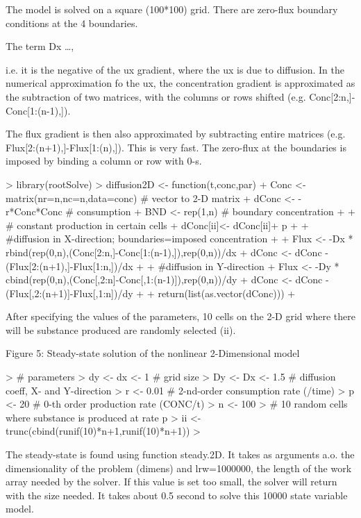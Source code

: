 \documentclass{tufte-handout}
\begin{document}
The model is solved on a square (100*100) grid. There are zero-flux boundary conditions at
the 4 boundaries.

The term Dx \ldots, 

i.e. it is the negative of the 
ux gradient, where the ux is due to diffusion. In the numerical approximation fo the 
ux, the concentration gradient is approximated as the subtraction of two matrices, with the columns or rows shifted (e.g. Conc[2:n,]-Conc[1:(n-1),]).

The flux gradient is then also approximated by subtracting entire matrices (e.g. Flux[2:(n+1),]-Flux[1:(n),]). This is very fast. The zero-flux at the boundaries is imposed by binding a column or row with 0-s.


\begin{Schunk}
\begin{Sinput}
> library(rootSolve)
> diffusion2D <- function(t,conc,par){
+ Conc <- matrix(nr=n,nc=n,data=conc) # vector to 2-D matrix
+ dConc <- -r*Conc*Conc # consumption
+ BND <- rep(1,n) # boundary concentration
+ 
+ # constant production in certain cells
+ dConc[ii]<- dConc[ii]+ p
+ 
+ #diffusion in X-direction; boundaries=imposed concentration
+ 
+ Flux <- -Dx * rbind(rep(0,n),(Conc[2:n,]-Conc[1:(n-1),]),rep(0,n))/dx
+ dConc <- dConc - (Flux[2:(n+1),]-Flux[1:n,])/dx
+ 
+ #diffusion in Y-direction
+ Flux <- -Dy * cbind(rep(0,n),(Conc[,2:n]-Conc[,1:(n-1)]),rep(0,n))/dy
+ dConc <- dConc - (Flux[,2:(n+1)]-Flux[,1:n])/dy
+ 
+ return(list(as.vector(dConc)))
+ }
\end{Sinput}
\end{Schunk}

After specifying the values of the parameters, 10 cells on the 2-D grid where there will be
substance produced are randomly selected (ii).


Figure 5: Steady-state solution of the nonlinear 2-Dimensional model

\begin{Schunk}
\begin{Sinput}
> # parameters
> dy <- dx <- 1 # grid size
> Dy <- Dx <- 1.5 # diffusion coeff, X- and Y-direction
> r <- 0.01 # 2-nd-order consumption rate (/time)
> p <- 20 # 0-th order production rate (CONC/t)
> n <- 100
> # 10 random cells where substance is produced at rate p
> ii <- trunc(cbind(runif(10)*n+1,runif(10)*n+1))
> 
\end{Sinput}
\end{Schunk}
The steady-state is found using function steady.2D. It takes as arguments a.o. the dimensionality
of the problem (dimens) and lrw=1000000, the length of the work array needed by
the solver. If this value is set too small, the solver will return with the size needed.
It takes about 0.5 second to solve this 10000 state variable model.
\end{document}
